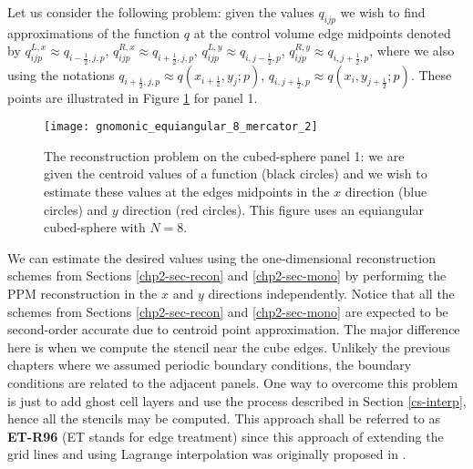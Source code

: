 Let us consider the following problem: given the values $q_{ijp}$ we wish to find approximations of 
the function $q$ at the control volume edge midpoints denoted by
$q^{L,x}_{ijp}  \approx q_{{i-\frac{1}{2}},j,p}$,
$q^{R,x}_{ijp}  \approx q_{{i+\frac{1}{2}},j,p}$,
$q^{L,y}_{ijp}  \approx q_{i,{j-\frac{1}{2}},p}$,
$q^{R,y}_{ijp}  \approx q_{i,{j+\frac{1}{2}},p}$, where we also using the notations
$q_{{i+\frac{1}{2}},j,p}  \approx q(x_{i+\frac{1}{2}},y_j; p)$,
$q_{i,{j+\frac{1}{2}},p}  \approx q(x_i,y_{j+\frac{1}{2}}; p)$.
These points are illustrated in Figure \ref{csgrid-rpoints} for panel 1.
\begin{figure}[!htb]
	\centering
	\texttt{[image: gnomonic\_equiangular\_8\_mercator\_2]}
	\caption{The reconstruction problem on the cubed-sphere panel 1: we are given the centroid values of a function (black circles)
		and we wish to estimate these values at the edges midpoints in the $x$ direction (blue circles) and $y$ direction (red circles).
		This figure uses an equiangular cubed-sphere with $N=8$.} \label{csgrid-rpoints}
\end{figure}

We can estimate the desired values using the one-dimensional reconstruction schemes from Sections \ref{chp2-sec-recon} and \ref{chp2-sec-mono}
by performing the PPM reconstruction in the $x$ and $y$ directions independently.
Notice that all the schemes from Sections \ref{chp2-sec-recon} and \ref{chp2-sec-mono} are expected to be second-order accurate due to centroid point approximation.
The major difference here is when we compute the stencil near the cube edges. 
Unlikely the previous chapters where we assumed periodic boundary conditions, the boundary conditions are related to the adjacent panels.
One way to overcome this problem is just to add ghost cell layers and use the process described in Section \ref{cs-interp}, hence
all the stencils may be computed. 
This approach shall be referred to as \textbf{ET-R96} (ET stands for edge treatment) since this approach of extending the grid lines and using Lagrange interpolation was originally proposed in \citet{ronchi:1996}.

